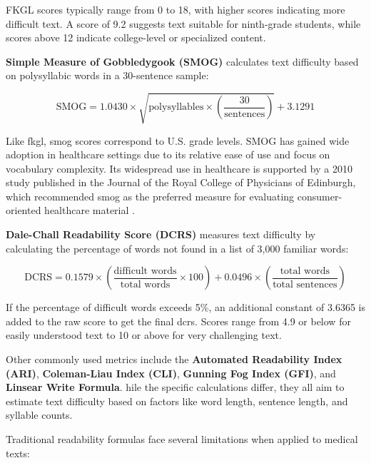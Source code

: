 FKGL scores typically range from 0 to 18, with higher scores indicating more difficult text. A score of 9.2 suggests text suitable for ninth-grade students, while scores above 12 indicate college-level or specialized content.

\textbf{Simple Measure of Gobbledygook (SMOG)} calculates text difficulty based on polysyllabic words in a 30-sentence sample:

\begin{equation}
    \text{SMOG} = 1.0430 \times \sqrt{\text{polysyllables} \times \left(\frac{30}{\text{sentences}}\right)} + 3.1291
\end{equation}

Like \gls{fkgl}, \gls{smog} scores correspond to U.S. grade levels. 
SMOG has gained wide adoption in healthcare settings due to its relative ease of use and focus on vocabulary complexity. Its widespread use in healthcare is supported by a 2010 study published in the Journal of the Royal College of Physicians of Edinburgh, which recommended \gls{smog} as the preferred measure for evaluating consumer-oriented healthcare material \cite{Fitzsimmons2010-mq}.

\textbf{Dale-Chall Readability Score (DCRS)} measures text difficulty by calculating the percentage of words not found in a list of 3,000 familiar words:

\begin{equation}
    \text{DCRS} = 0.1579 \times \left(\frac{\text{difficult words}}{\text{total words}} \times 100\right) + 0.0496 \times \left(\frac{\text{total words}}{\text{total sentences}}\right)
\end{equation}

If the percentage of difficult words exceeds 5\%, an additional constant of 3.6365 is added to the raw score to get the final \gls{dcrs}. Scores range from 4.9 or below for easily understood text to 10 or above for very challenging text.

Other commonly used metrics include the \textbf{Automated Readability Index (ARI)}, \textbf{Coleman-Liau Index (CLI)}, \textbf{Gunning Fog Index (GFI)}, and \textbf{Linsear Write Formula}. 
hile the specific calculations differ, they all aim to estimate text difficulty based on factors like word length, sentence length, and syllable counts.

Traditional readability formulas face several limitations when applied to medical texts:

